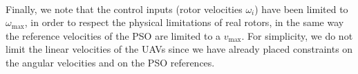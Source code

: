 \documentclass[main]{subfiles}
\begin{document}
\noindent\\
Finally, we note that the control inputs (rotor velocities
$\omega_i$) have been limited to $\omega_\text{max}$, 
in order to respect the physical limitations of real 
rotors, in the same way the reference velocities of the 
PSO are limited to a $v_\text{max}$.
For simplicity, we do not limit the linear velocities of the UAVs 
since we have already placed constraints on the angular velocities 
and on the PSO references.
\end{document}
